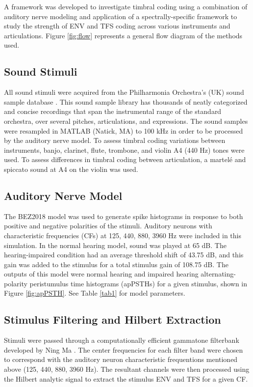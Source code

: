 \documentclass[conference]{IEEEtran}
\begin{document}
A framework was developed to investigate timbral coding using a combination of auditory nerve modeling and application of a spectrally-specific framework to study the strength of ENV and TFS coding across various instruments and articulations. Figure \ref{fig:flow} represents a general flow diagram of the methods used.


\subsection{Sound Stimuli}

All sound stimuli were acquired from the Philharmonia Orchestra's (UK) sound sample database \cite{noauthor_sound_nodate}. This sound sample library has thousands of neatly categorized and concise recordings that span the instrumental range of the standard orchestra, over several pitches, articulations, and expressions. The sound samples were resampled in MATLAB (Natick, MA) to 100 kHz in order to be processed by the auditory nerve model. To assess timbral coding variations between instruments, banjo, clarinet, flute, trombone, and violin A4 (440 Hz) tones were used. To assess differences in timbral coding between articulation, a martel\'{e} and spiccato sound at A4 on the violin was used. 

\subsection{Auditory Nerve Model}
The BEZ2018 model was used to generate spike histograms in response to both positive and negative polarities of the stimuli. Auditory neurons with characteristic frequencies (CFs) at 125, 440, 880, 3960 Hz were included in this simulation. In the normal hearing model, sound was played at 65 dB. The hearing-impaired condition had an average threshold shift of 43.75 dB, and this gain was added to the stimulus for a total stimulus gain of 108.75 dB. The outputs of this model were normal hearing and impaired hearing alternating-polarity peristumulus time histograms (apPSTHs) for a given stimulus, shown in Figure \ref{fig:apPSTH}. See Table \ref{tab1} for model parameters.

\subsection{Stimulus Filtering and Hilbert Extraction}

Stimuli were passed through a computationally efficient gammatone filterbank developed by Ning Ma \cite{ma_efficient_nodate}. The center frequencies for each filter band were chosen to correspond with the auditory neuron characteristic frequentions mentioned above (125, 440, 880, 3960 Hz). The resultant channels were then processed using the Hilbert analytic signal to extract the stimulus ENV and TFS for a given CF. 
\end{document}
